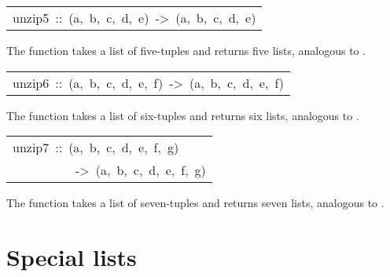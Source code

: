 \begin{haddockdesc}
\item[\begin{tabular}{@{}l}
unzip5\ ::\ {\char 91}(a,\ b,\ c,\ d,\ e){\char 93}\ ->\ ({\char 91}a{\char 93},\ {\char 91}b{\char 93},\ {\char 91}c{\char 93},\ {\char 91}d{\char 93},\ {\char 91}e{\char 93})
\end{tabular}]\haddockbegindoc
The  function takes a list of five-tuples and returns five
 lists, analogous to .
\par

\end{haddockdesc}
\begin{haddockdesc}
\item[\begin{tabular}{@{}l}
unzip6\ ::\ {\char 91}(a,\ b,\ c,\ d,\ e,\ f){\char 93}\ ->\ ({\char 91}a{\char 93},\ {\char 91}b{\char 93},\ {\char 91}c{\char 93},\ {\char 91}d{\char 93},\ {\char 91}e{\char 93},\ {\char 91}f{\char 93})
\end{tabular}]\haddockbegindoc
The  function takes a list of six-tuples and returns six
 lists, analogous to .
\par

\end{haddockdesc}
\begin{haddockdesc}
\item[\begin{tabular}{@{}l}
unzip7\ ::\ {\char 91}(a,\ b,\ c,\ d,\ e,\ f,\ g){\char 93}\\\ \ \ \ \ \ \ \ \ \ ->\ ({\char 91}a{\char 93},\ {\char 91}b{\char 93},\ {\char 91}c{\char 93},\ {\char 91}d{\char 93},\ {\char 91}e{\char 93},\ {\char 91}f{\char 93},\ {\char 91}g{\char 93})
\end{tabular}]\haddockbegindoc
The  function takes a list of seven-tuples and returns
 seven lists, analogous to .
\par

\end{haddockdesc}
\section{Special lists
}
